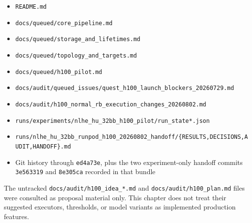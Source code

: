 \documentclass[
  10pt,
  letterpaper,
]{article}
\providecommand{\tightlist}{%
  \setlength{\itemsep}{0pt}\setlength{\parskip}{0pt}}
\begin{document}
\begin{itemize}
\tightlist
\item
  \texttt{README.md}
\item
  \texttt{docs/queued/core\_pipeline.md}
\item
  \texttt{docs/queued/storage\_and\_lifetimes.md}
\item
  \texttt{docs/queued/topology\_and\_targets.md}
\item
  \texttt{docs/queued/h100\_pilot.md}
\item
  \texttt{docs/audit/queued\_issues/quest\_h100\_launch\_blockers\_20260729.md}
\item
  \texttt{docs/audit/h100\_normal\_rb\_execution\_changes\_20260802.md}
\item
  \texttt{runs/experiments/nlhe\_hu\_32bb\_h100\_pilot/run\_state*.json}
\item
  \texttt{runs/nlhe\_hu\_32bb\_runpod\_h100\_20260802\_handoff/\{RESULTS,DECISIONS,AUDIT,HANDOFF\}.md}
\item
  Git history through \texttt{ed4a73e}, plus the two experiment-only
  handoff commits \texttt{3e563319} and \texttt{8e305ca} recorded in
  that bundle
\end{itemize}

The untracked \texttt{docs/audit/h100\_idea\_*.md} and
\texttt{docs/audit/h100\_plan.md} files were consulted as proposal
material only. This chapter does not treat their suggested executors,
thresholds, or model variants as implemented production features.
\end{document}
